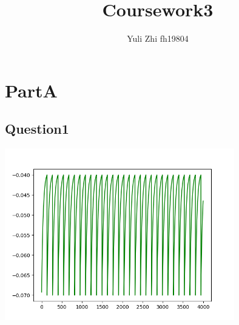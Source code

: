 \documentclass[fleqn,11pt]{article}
\begin{document}
\title{Coursework3}
\author{Yuli Zhi fh19804}
\date{}
\maketitle
\section*{PartA}
\subsection*{Question1}

\begin{center} 
    \includegraphics[width=10cm]{graphs/Question1.png}
\end{center}
\end{document}
